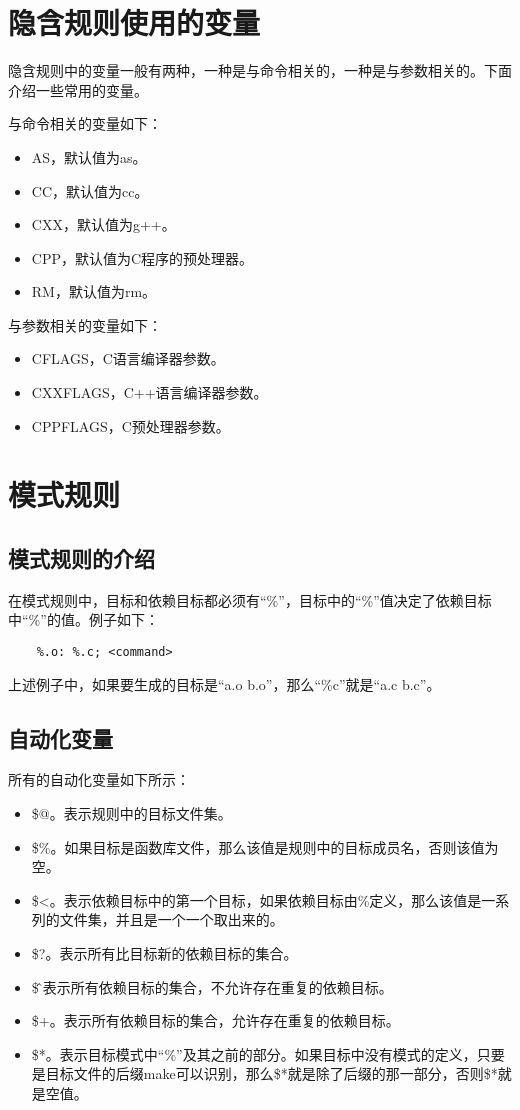 \documentclass[a4paper,left=2.5cm,right=2.5cm,11pt]{article}
\begin{document}
\section{隐含规则使用的变量}
	隐含规则中的变量一般有两种，一种是与命令相关的，一种是与参数相关的。下面介绍一些常用的变量。\par

	与命令相关的变量如下：
	\begin{itemize}
		\item AS，默认值为as。
		\item CC，默认值为cc。
		\item CXX，默认值为g++。
		\item CPP，默认值为C程序的预处理器。
		\item RM，默认值为rm。
	\end{itemize}

	与参数相关的变量如下：
	\begin{itemize}
		\item CFLAGS，C语言编译器参数。
		\item CXXFLAGS，C++语言编译器参数。
		\item CPPFLAGS，C预处理器参数。
	\end{itemize}

\section{模式规则}
\subsection{模式规则的介绍}
	在模式规则中，目标和依赖目标都必须有“\%”，目标中的“\%”值决定了依赖目标中“\%”的值。例子如下：
	\begin{lstlisting}
	%.o: %.c; <command>
	\end{lstlisting}

	上述例子中，如果要生成的目标是“a.o b.o”，那么“\%c”就是“a.c b.c”。

\subsection{自动化变量}
	所有的自动化变量如下所示：
	\begin{itemize}
		\item \$@。表示规则中的目标文件集。
		\item \$\%。如果目标是函数库文件，那么该值是规则中的目标成员名，否则该值为空。
		\item \$<。表示依赖目标中的第一个目标，如果依赖目标由\%定义，那么该值是一系列的文件集，并且是一个一个取出来的。
		\item \$?。表示所有比目标新的依赖目标的集合。
		\item \$\^。表示所有依赖目标的集合，不允许存在重复的依赖目标。
		\item \$+。表示所有依赖目标的集合，允许存在重复的依赖目标。
		\item \$*。表示目标模式中“\%”及其之前的部分。如果目标中没有模式的定义，只要是目标文件的后缀make可以识别，那么\$*就是除了后缀的那一部分，否则\$*就是空值。
	\end{itemize}
\end{document}
